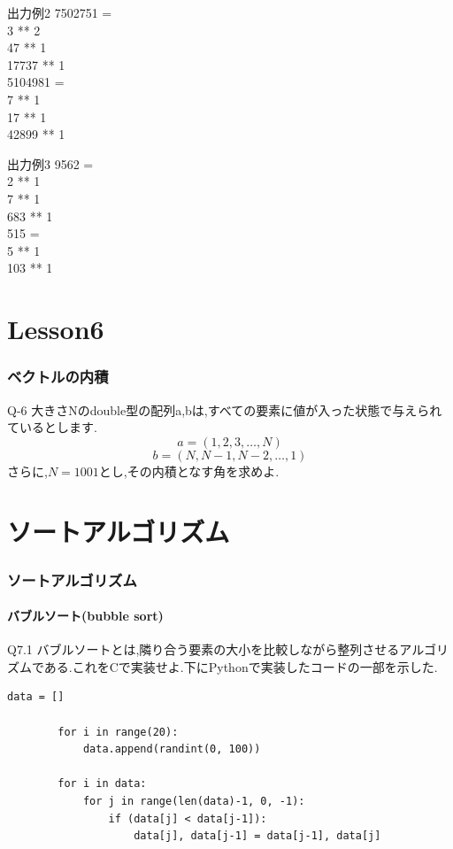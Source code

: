 \documentclass[dvipdfmx]{beamer}
\begin{document}
\begin{frame}
	\begin{block}{出力例2}
		7502751 =\\
		3 ** 2\\
		47 ** 1\\
		17737 ** 1\\
		5104981 =\\
		7 ** 1\\
		17 ** 1\\
		42899 ** 1\\
	\end{block}
	\begin{block}{出力例3}
		9562 =\\
		2 ** 1\\
		7 ** 1\\
		683 ** 1\\
		515 =\\
		5 ** 1\\
		103 ** 1
	\end{block}
\end{frame}

\section{Lesson6}
\begin{frame}
	\frametitle{ベクトルの内積}
	\begin{itembox}[l]{Q-6}
		大きさNのdouble型の配列a,bは,すべての要素に値が入った状態で与えられているとします.\\
		$$a = (1,2,3,\dots,N)$$
		$$b = (N, N-1, N-2,\dots,1)$$
		さらに,$N=1001$とし,その内積となす角を求めよ.
	\end{itembox}
\end{frame}

\section{ソートアルゴリズム}
\begin{frame}[t, fragile]
    \frametitle{ソートアルゴリズム}
    \framesubtitle{バブルソート(bubble sort)}
    \begin{itembox}[l]{Q7.1}
        バブルソートとは,隣り合う要素の大小を比較しながら整列させるアルゴリズムである.これをCで実装せよ.下にPythonで実装したコードの一部を示した.
    \end{itembox}
    \begin{lstlisting}[gobble=8, caption=bubbleSort.py, label=bubbleSort]
        data = []

        for i in range(20):
            data.append(randint(0, 100))

        for i in data:
            for j in range(len(data)-1, 0, -1):
                if (data[j] < data[j-1]):
                    data[j], data[j-1] = data[j-1], data[j]
    \end{lstlisting}
\end{frame}
\end{document}
